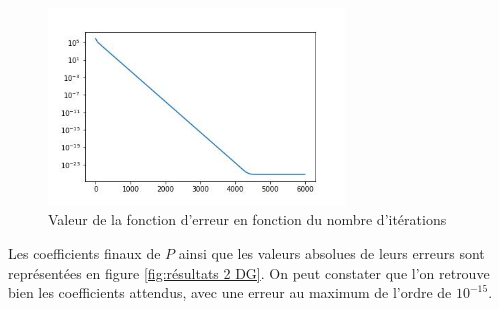 \documentclass[12pt]{report}
\begin{document}
\begin{figure}
    \centering
    \includegraphics[width=0.7\textwidth]{Erreur_2_DG.jpg}
    \caption{\label{fig:Erreur_2_DG}Valeur de la fonction d'erreur en fonction du nombre d'itérations}
\end{figure}

Les coefficients finaux de $P$ ainsi que les valeurs absolues de leurs erreurs sont représentées 
en figure \ref{fig:résultats 2 DG}.
On peut constater que l'on retrouve bien les coefficients attendus, avec une erreur au maximum de 
l'ordre de $10^{-15}$.
\end{document}
